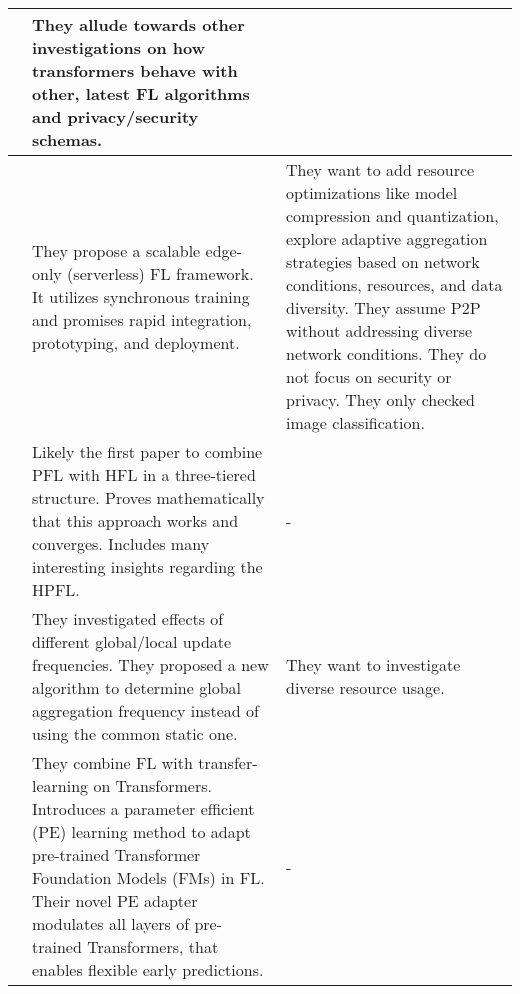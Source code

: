 \begin{changemargin}{-2cm}{0cm}
\begin{tabular}{|c||m{0.4\paperwidth}|m{0.4\paperwidth}|}
            &
            They allude towards other investigations on how transformers behave with other, latest FL algorithms and privacy/security schemas.
        \\
        \hline
            \cite{paper:edgefl_framework}
            &
            They propose a scalable edge-only (serverless) FL framework.
            It utilizes synchronous training and promises rapid integration, prototyping, and deployment.
            &
            They want to add resource optimizations like model compression and quantization,
            explore adaptive aggregation strategies based on network conditions, resources, and data diversity.
            They assume P2P without addressing diverse network conditions.
            They do not focus on security or privacy.
            They only checked image classification.
        \\
        \hline
            \cite{HPFL_over_massive_mobile_edge_computing_networks}
            & 
            Likely the first paper to combine PFL with HFL in a three-tiered structure.
            Proves mathematically that this approach works and converges.
            Includes many interesting insights regarding the HPFL.
            &
            -
        \\
        \hline
            \cite{paper:adaptive_fl_for_resource_constrained_edge}
            &
            They investigated effects of different global/local update frequencies.
            They proposed a new algorithm to determine global aggregation frequency instead of using the common static one.
            &
            They want to investigate diverse resource usage.
        \\

        \hline
            \cite{paper:fl_inference_anytime_anywhere}
            &
            They combine FL with transfer-learning on Transformers.
            Introduces a parameter efficient (PE) learning method to adapt pre-trained Transformer Foundation Models (FMs) in FL.
            Their novel PE adapter modulates all layers of pre-trained Transformers,
            that enables flexible early predictions.
            &
            -
        \\
        \hline
    \end{tabular}
\end{changemargin}